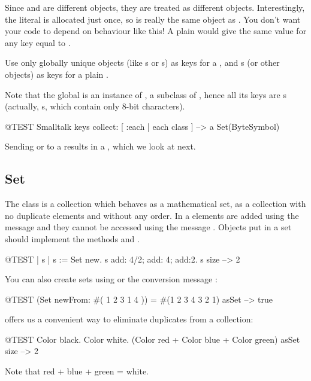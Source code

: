 \documentclass[a4paper,10pt,twoside]{book}
\begin{document}
\noindent
Since  and  are different objects, they are treated as different objects.
Interestingly, the literal \mbox{} is allocated just once, so is really the same object as .
You don't want your code to depend on behaviour like this!
A plain  would give the same value for any key equal to .

Use only globally unique objects (like s or s) as keys for a , and s (or other objects) as keys for a plain .


Note that the global  is an instance of , a subclass of , hence all its keys are s (actually, s, which contain only 8-bit characters).

\begin{code}{@TEST}
Smalltalk keys collect: [ :each | each class ] --> a Set(ByteSymbol)
\end{code}
\noindent
Sending  or  to a  results in a , which we look at next.

\subsection{Set}
The class  is a collection which behaves as a mathematical set, \ie as a collection with no duplicate elements and without any order. In a  elements are added using the message  and they cannot be accessed using the message . Objects put in a set should implement the methods  and \ct{=}.

\begin{code}{@TEST | s | }
s := Set new.
s add: 4/2; add: 4; add:2.
s size --> 2
\end{code}

You can also create sets using  or the conversion message :

\begin{code}{@TEST}
(Set newFrom: #( 1 2 3 1 4 )) = #(1 2 3 4 3 2 1) asSet --> true
\end{code}

 offers us a convenient way to eliminate duplicates from a collection:
\begin{code}{@TEST}
{ Color black. Color white. (Color red + Color blue + Color green) } asSet size --> 2
\end{code}
\noindent
Note that red + blue + green = white.
\end{document}
